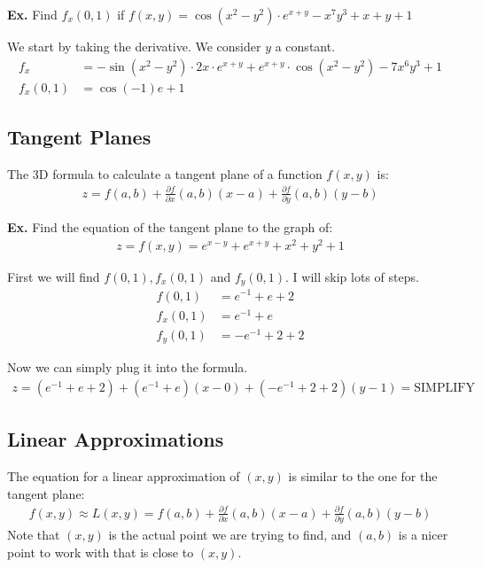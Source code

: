\documentclass[12pt,letterpaper]{article} \usepackage{amsmath} \usepackage{graphicx}  \usepackage{longtable}  \usepackage{amssymb}
\begin{document}
        \begin{mdframed}
            \textbf{Ex. } Find $f_x(0,1)$ if $f(x,y) = \cos(x^2 - y^2) \cdot e^{x+y} - x^7y^3+x+y+1$

            We start by taking the derivative. We consider $y$ a constant.
            \begin{align*}
                f_x &= -\sin(x^2 - y^2)\cdot 2x\cdot e^{x+y} + e^{x+y}\cdot \cos(x^2-y^2) - 7x^6y^3+1\\
                f_x (0,1) &= \cos(-1)e+1
            \end{align*}
        \end{mdframed}

        \subsection{Tangent Planes}
        The 3D formula to calculate a tangent plane of a function $f(x,y)$ is:
        \begin{align*}
            z=f(a,b) + \frac{\partial f}{\partial x}(a,b) (x-a) + \frac{\partial f}{\partial y}(a,b)(y-b)
        \end{align*}

        \begin{mdframed}
            \textbf{Ex. } Find the equation of the tangent plane to the graph of:
            \begin{align*}
                z=f(x,y)=e^{x-y} + e^{x+y} + x^2 + y^2 + 1
            \end{align*}

            First we will find $f(0,1), f_x(0,1)$ and $f_y(0,1)$. I will skip lots of steps.
            \begin{align*}
                f(0,1) &= e^{-1}+e+2\\
                f_x(0,1)&=e^{-1} + e\\
                f_y(0,1) &= -e^{-1}+2+2
            \end{align*}

            Now we can simply plug it into the formula. 
            \begin{align*}
                z=(e^{-1}+e+2)+(e^{-1} + e)(x-0) + (-e^{-1}+2+2)(y-1) = \text{SIMPLIFY}
            \end{align*}
        \end{mdframed}

        \subsection{Linear Approximations}
        The equation for a linear approximation of $(x,y)$ is similar to the one for the tangent plane:
        \begin{align*}
            f(x,y)\approx L(x,y)=f(a,b) + \frac{\partial f}{\partial x}(a,b) (x-a) + \frac{\partial f}{\partial y}(a,b)(y-b)
        \end{align*}
        Note that $(x,y)$ is the actual point we are trying to find, and $(a,b)$ is a nicer point to work with that is close to $(x,y)$.
\end{document}
